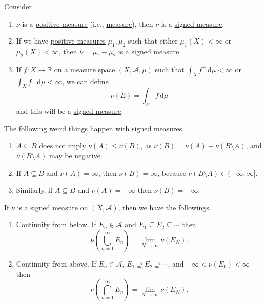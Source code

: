 \begin{eg}
	Consider
	\begin{enumerate}
		\item \(\nu\) is a \hyperref[def:signed-measure]{positive measure} (i.e., \hyperref[def:measure]{measure}), then \(\nu\) is a \hyperref[def:signed-measure]{signed measure}.
		\item If we have \hyperref[def:signed-measure]{positive measures} \(\mu_1,\mu_2\) such that either \(\mu_1(X) < \infty\) or \(\mu_2(X) < \infty\), then \(\nu = \mu_1 - \mu_2\) is a \hyperref[def:signed-measure]{signed measure}.
		\item If \(f \colon X \to \overline{\mathbb{R}}\) on a \hyperref[def:measure-space]{measure space} \((X,\mathcal{A},\mu)\) such that \(\int_X f^+ \,\mathrm{d} \mu < \infty\) or \(\int_X f^- \,\mathrm{d} \mu < \infty\), we can define
		      \[
			      \nu(E) = \int_E f \,\mathrm{d} \mu
		      \]
		      and this will be a \hyperref[def:signed-measure]{signed measure}.
	\end{enumerate}
\end{eg}

\begin{note}
	The following weird things happen with \hyperref[def:signed-measure]{signed measures}.
	\begin{enumerate}
		\item \(A \subseteq B\) does not imply \(\nu(A) \leq \nu(B)\), as \(\nu(B) = \nu(A) + \nu(B \setminus A)\), and \(\nu(B \setminus A)\) may be negative.
		\item If \(A \subseteq B\) and \(\nu(A) = \infty\), then \(\nu(B) = \infty\), because \(\nu(B \setminus A) \in (-\infty,\infty]\).
		\item Similarly, if \(A \subseteq B\) and \(\nu(A) = -\infty\) then \(\nu(B) = -\infty\).
	\end{enumerate}
\end{note}

\begin{lemma}\label{lemma:signed-cont-above-below}
	If \(\nu\) is a \hyperref[def:signed-measure]{signed measure} on \((X, \mathcal{A})\), then we have the followings.
	\begin{enumerate}
		\item\label{lma:signed-continuity-from-below} Continuity from below. If \(E_n \in \mathcal{A}\) and \(E_1 \subseteq E_2 \subseteq \cdots\) then
		\[
			\nu\left( \bigcup_{n=1}^\infty E_n \right)  = \lim_{N \to \infty} \nu(E_N).
		\]
		\item\label{lma:signed-continuity-from-above} Continuity from above. If \(E_n \in \mathcal{A}\), \(E_1 \supseteq E_2 \supseteq \cdots\),
		and \(-\infty < \nu(E_1) < \infty\) then
		\[
			\nu\left( \bigcap_{n=1}^\infty E_n \right)  = \lim_{N \to \infty} \nu(E_N).
		\]
	\end{enumerate}
\end{lemma}

